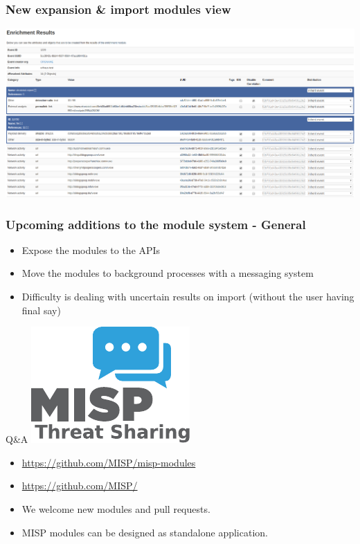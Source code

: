 \begin{frame}[fragile]
    \frametitle{New expansion \& import modules view}
    \includegraphics[scale=0.2]{new_format_view.png}
\end{frame}

\begin{frame}[fragile]
    \frametitle{Upcoming additions to the module system - General}
    \begin{itemize}
        \item Expose the modules to the APIs
        \item Move the modules to background processes with a messaging system
        \item Difficulty is dealing with uncertain results on import (without the user having final say)
    \end{itemize}
\end{frame}

\begin{frame}[t,fragile] {Q\&A}
\includegraphics[scale=0.5]{misplogo.pdf}
\begin{itemize}
        \item \url{https://github.com/MISP/misp-modules}
        \item \url{https://github.com/MISP/}
        \item We welcome new modules and pull requests.
        \item MISP modules can be designed as standalone application.
\end{itemize}

\end{frame}

